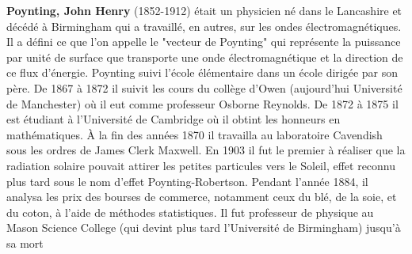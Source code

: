 \textbf{Poynting, John Henry} (1852-1912) était un physicien né dans le Lancashire et décédé à Birmingham qui a travaillé, en autres, sur les ondes électromagnétiques. Il a défini ce que l'on appelle le "vecteur de Poynting" qui représente la puissance par unité de surface que transporte une onde électromagnétique et la direction de ce flux d'énergie. Poynting suivi l'école élémentaire dans un école dirigée par son père. De 1867 à 1872 il suivit les cours du collège d'Owen (aujourd'hui Université de Manchester) où il eut comme professeur Osborne Reynolds. De 1872 à 1875 il est étudiant à l'Université de Cambridge où il obtint les honneurs en mathématiques. À la fin des années 1870 il travailla au laboratoire Cavendish sous les ordres de James Clerk Maxwell. En 1903 il fut le premier à réaliser que la radiation solaire pouvait attirer les petites particules vers le Soleil, effet reconnu plus tard sous le nom d'effet Poynting-Robertson. Pendant l'année 1884, il analysa les prix des bourses de commerce, notamment ceux du blé, de la soie, et du coton, à l'aide de méthodes statistiques. Il fut professeur de physique au Mason Science College (qui devint plus tard l'Université de Birmingham) jusqu'à sa mort

{}
\label{sec:R}

